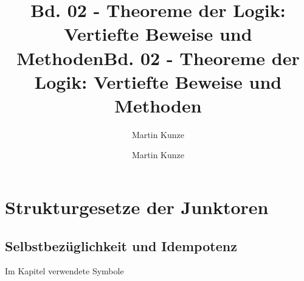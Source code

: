 \documentclass[main.tex]{subfiles}
\title{Bd. 02 - Theoreme der Logik: Vertiefte Beweise und Methoden}
\author{Martin Kunze}
\date{}
\begin{document}
\title{Bd. 02 - Theoreme der Logik: Vertiefte Beweise und Methoden}
\author{Martin Kunze}
\date{}
\hypersetup{pageanchor=false}
\maketitle
\hypersetup{pageanchor=true}
\tableofcontents
\setcounter{file}{2}
\renewcommand{\FormulaBandID}{2}


\chapter{Strukturgesetze der Junktoren}

\section{Selbstbezüglichkeit und Idempotenz}
\begin{DeltaContext}{Im Kapitel verwendete Symbole}
\end{DeltaContext}

\begin{tabproof}
\end{tabproof}

\begin{tabproof}
\end{tabproof}

\begin{tabproof}
\end{tabproof}

\begin{tabproofsplit}
  \proofpart{\(\vdash\)}
  \closeproofpart

  \proofpart{\(\dashv\)}
  \closeproofpart
\end{tabproofsplit}


\begin{tabproofsplit}
  \proofpart{\(\vdash\)}
  \closeproofpart

  \proofpart{\(\dashv\)}
  \closeproofpart
\end{tabproofsplit}
\end{document}
